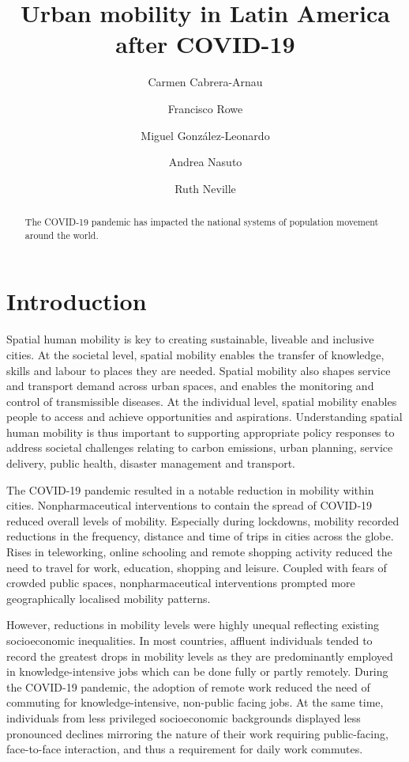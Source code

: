 \documentclass[
  11pt,
]{article}
\title{\textbf{Urban mobility in Latin America after COVID-19}}
\author[1]{Carmen Cabrera-Arnau}
\author[1]{Francisco Rowe}
\author[2]{Miguel González-Leonardo}
\author[1]{Andrea Nasuto}
\author[1]{Ruth Neville}
\affil[1]{Geographic Data Science Lab, Department of Geography and
Planning, University of Liverpool, Liverpool, UK}
\affil[2]{Centre for Demographic Urban and Environmental Studies, El
Colegio de México, Ciudad de México, México}
\date{}
\begin{document}
\maketitle
\begin{abstract}
The COVID‐19 pandemic has impacted the national systems of population
movement around the world.
\end{abstract}
\ifdefined\Shaded\renewenvironment{Shaded}{\begin{tcolorbox}[boxrule=0pt, interior hidden, sharp corners, breakable, borderline west={3pt}{0pt}{shadecolor}, frame hidden, enhanced]}{\end{tcolorbox}}\fi

\hypertarget{sec-intro}{%
\section{Introduction}\label{sec-intro}}

Spatial human mobility is key to creating sustainable, liveable and
inclusive cities. At the societal level, spatial mobility enables the
transfer of knowledge, skills and labour to places they are needed.
Spatial mobility also shapes service and transport demand across urban
spaces, and enables the monitoring and control of transmissible
diseases. At the individual level, spatial mobility enables people to
access and achieve opportunities and aspirations. Understanding spatial
human mobility is thus important to supporting appropriate policy
responses to address societal challenges relating to carbon emissions,
urban planning, service delivery, public health, disaster management and
transport.

The COVID-19 pandemic resulted in a notable reduction in mobility within
cities. Nonpharmaceutical interventions to contain the spread of
COVID‐19 reduced overall levels of mobility. Especially during
lockdowns, mobility recorded reductions in the frequency, distance and
time of trips in cities across the globe. Rises in teleworking, online
schooling and remote shopping activity reduced the need to travel for
work, education, shopping and leisure. Coupled with fears of crowded
public spaces, nonpharmaceutical interventions prompted more
geographically localised mobility patterns.

However, reductions in mobility levels were highly unequal reflecting
existing socioeconomic inequalities. In most countries, affluent
individuals tended to record the greatest drops in mobility levels as
they are predominantly employed in knowledge-intensive jobs which can be
done fully or partly remotely. During the COVID-19 pandemic, the
adoption of remote work reduced the need of commuting for
knowledge-intensive, non-public facing jobs. At the same time,
individuals from less privileged socioeconomic backgrounds displayed
less pronounced declines mirroring the nature of their work requiring
public-facing, face-to-face interaction, and thus a requirement for
daily work commutes.
\end{document}
